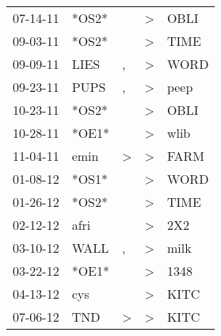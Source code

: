 \begin{supertabular}{p{0.07\textwidth}p{0.06\textwidth}p{0.02\textwidth}p{0.02\textwidth}p{0.06\textwidth}}
          07-14-11\textsuperscript{} &                            *OS2* &                  &     \textgreater &           OBLI\textsuperscript{} \\
          09-03-11\textsuperscript{} &                            *OS2* &                  &     \textgreater &           TIME\textsuperscript{} \\
          09-09-11\textsuperscript{} &           LIES\textsuperscript{} &                , &     \textgreater &           WORD\textsuperscript{} \\
          09-23-11\textsuperscript{} &           PUPS\textsuperscript{} &                , &     \textgreater &           peep\textsuperscript{} \\
          10-23-11\textsuperscript{} &                            *OS2* &                  &     \textgreater &           OBLI\textsuperscript{} \\
          10-28-11\textsuperscript{} &                            *OE1* &                  &     \textgreater &           wlib\textsuperscript{} \\
          11-04-11\textsuperscript{} &           emin\textsuperscript{} &     \textgreater &     \textgreater &           FARM\textsuperscript{} \\
          01-08-12\textsuperscript{} &                            *OS1* &                  &     \textgreater &           WORD\textsuperscript{} \\
          01-26-12\textsuperscript{} &                            *OS2* &                  &     \textgreater &           TIME\textsuperscript{} \\
          02-12-12\textsuperscript{} &           afri\textsuperscript{} &                  &     \textgreater &            2X2\textsuperscript{} \\
          03-10-12\textsuperscript{} &           WALL\textsuperscript{} &                , &     \textgreater &           milk\textsuperscript{} \\
          03-22-12\textsuperscript{} &                            *OE1* &                  &     \textgreater &           1348\textsuperscript{} \\
          04-13-12\textsuperscript{} &            cys\textsuperscript{} &                  &     \textgreater &           KITC\textsuperscript{} \\
          07-06-12\textsuperscript{} &            TND\textsuperscript{} &     \textgreater &     \textgreater &           KITC\textsuperscript{} \\

\end{supertabular}
